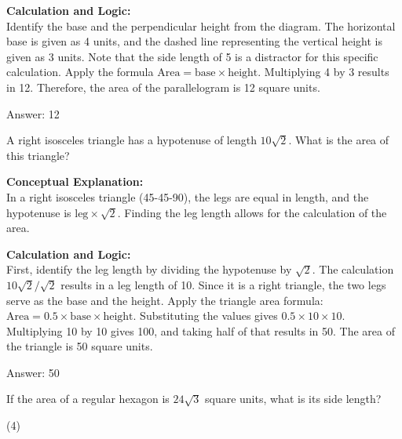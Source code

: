 \documentclass[11pt,paper=a4,answers]{exam}
\begin{document}
\begin{questions}
\begin{solution}
\vspace{30pt}

\textbf{Calculation and Logic:} \\
Identify the base and the perpendicular height from the diagram. The horizontal base is given as 4 units, and the dashed line representing the vertical height is given as 3 units. Note that the side length of 5 is a distractor for this specific calculation. Apply the formula $\text{Area} = \text{base} \times \text{height}$. Multiplying 4 by 3 results in 12. Therefore, the area of the parallelogram is 12 square units.

\vspace{30pt}

Answer: \colorbox{yellow!100}{12}
\end{solution}

\vspace{60pt}

\question
A right isosceles triangle has a hypotenuse of length $10\sqrt{2}$. What is the area of this triangle?

\begin{solution}
\textbf{Conceptual Explanation:} \\
In a right isosceles triangle (45-45-90), the legs are equal in length, and the hypotenuse is $\text{leg} \times \sqrt{2}$. Finding the leg length allows for the calculation of the area.

\vspace{30pt}

\textbf{Calculation and Logic:} \\
First, identify the leg length by dividing the hypotenuse by $\sqrt{2}$. The calculation $10\sqrt{2} / \sqrt{2}$ results in a leg length of 10. Since it is a right triangle, the two legs serve as the base and the height. Apply the triangle area formula: $\text{Area} = 0.5 \times \text{base} \times \text{height}$. Substituting the values gives $0.5 \times 10 \times 10$. Multiplying 10 by 10 gives 100, and taking half of that results in 50. The area of the triangle is 50 square units.

\vspace{30pt}

Answer: \colorbox{yellow!100}{50}
\end{solution}

\vspace{60pt}

\question
If the area of a regular hexagon is $24\sqrt{3}$ square units, what is its side length?
\begin{tasks}(4)
\end{tasks}


\end{questions}
\end{document}
